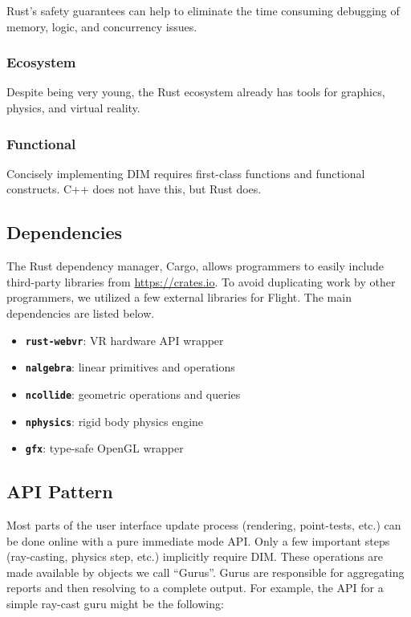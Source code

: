 \documentclass[conference,12pt]{IEEEtran}
\begin{document}
Rust's safety guarantees can help to eliminate the time consuming debugging of
memory, logic, and concurrency issues.

\subsubsection{Ecosystem}

Despite being very young, the Rust ecosystem already has tools for graphics,
physics, and virtual reality.

\subsubsection{Functional}

Concisely implementing DIM requires first-class functions and functional
constructs. C++ does not have this, but Rust does.


\subsection{Dependencies}
The Rust dependency manager, Cargo, allows programmers to easily include
third-party libraries from \url{https://crates.io}. To avoid duplicating work
by other programmers, we utilized a few external libraries for Flight. The main
dependencies are listed below.
\begin{itemize}
    \item \textbf{\texttt{rust-webvr}}: VR hardware API wrapper
    \item \textbf{\texttt{nalgebra}}: linear primitives and operations
    \item \textbf{\texttt{ncollide}}: geometric operations and queries
    \item \textbf{\texttt{nphysics}}: rigid body physics engine
    \item \textbf{\texttt{gfx}}: type-safe OpenGL wrapper
\end{itemize}

\subsection{API Pattern}

Most parts of the user interface update process (rendering, point-tests, etc.)
can be done online with a pure immediate mode API. Only a few important steps
(ray-casting, physics step, etc.) implicitly require DIM. These operations are
made available by objects we call ``Gurus''. Gurus are responsible for
aggregating reports and then resolving to a complete output. For example, the
API for a simple ray-cast guru might be the following:
\end{document}
